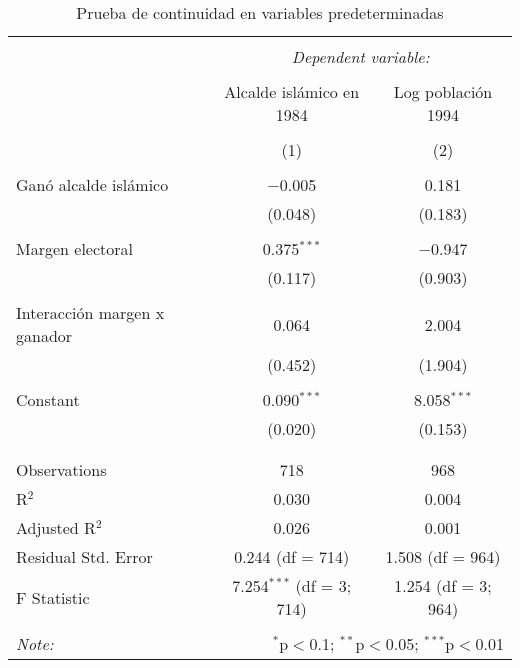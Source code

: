 
\begin{table}[!htbp] \centering 
  \caption{Prueba de continuidad en variables predeterminadas} 
  \label{tab:continuidad_predeterminadas} 
\begin{tabular}{@{\extracolsep{5pt}}lcc} 
\\[-1.8ex]\hline 
\hline \\[-1.8ex] 
 & \multicolumn{2}{c}{\textit{Dependent variable:}} \\ 
\cline{2-3} 
\\[-1.8ex] & Alcalde islámico en 1984 & Log población 1994 \\ 
\\[-1.8ex] & (1) & (2)\\ 
\hline \\[-1.8ex] 
 Ganó alcalde islámico & $-$0.005 & 0.181 \\ 
  & (0.048) & (0.183) \\ 
  & & \\ 
 Margen electoral & 0.375$^{***}$ & $-$0.947 \\ 
  & (0.117) & (0.903) \\ 
  & & \\ 
 Interacción margen x ganador & 0.064 & 2.004 \\ 
  & (0.452) & (1.904) \\ 
  & & \\ 
 Constant & 0.090$^{***}$ & 8.058$^{***}$ \\ 
  & (0.020) & (0.153) \\ 
  & & \\ 
\hline \\[-1.8ex] 
Observations & 718 & 968 \\ 
R$^{2}$ & 0.030 & 0.004 \\ 
Adjusted R$^{2}$ & 0.026 & 0.001 \\ 
Residual Std. Error & 0.244 (df = 714) & 1.508 (df = 964) \\ 
F Statistic & 7.254$^{***}$ (df = 3; 714) & 1.254 (df = 3; 964) \\ 
\hline 
\hline \\[-1.8ex] 
\textit{Note:}  & \multicolumn{2}{r}{$^{*}$p$<$0.1; $^{**}$p$<$0.05; $^{***}$p$<$0.01} \\ 
\end{tabular} 
\end{table} 
